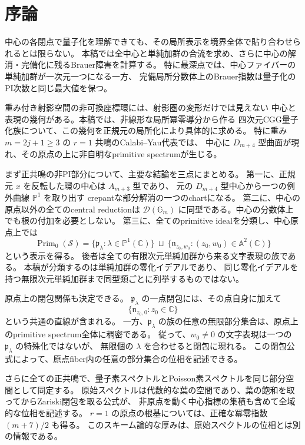 \section{序論}

中心の各閉点で量子化を理解できても、その局所表示を境界全体で貼り合わせられるとは限らない。
本稿では全中心と単純加群の合流を求め、さらに中心の解消・完備化に残るBrauer障害を計算する。
特に最深点では、中心ファイバーの単純加群が一次元一つになる一方、
完備局所分数体上のBrauer指数は量子化のPI次数と同じ最大値を保つ。

重み付き射影空間の非可換座標環には、射影圏の変形だけでは見えない
中心と表現の幾何がある。本稿では、非線形な局所冪零導分から作る
四次元CGG量子化族について、この幾何を正規元の局所化により具体的に求める。
特に重み $m=2j+1\ge3$ の $r=1$ 共鳴のCalabi--Yau代表では、
中心に $D_{m+4}$ 型曲面が現れ、その原点の上に非自明なprimitive spectrumが生じる。

まず正共鳴の非PI部分について、主要な結論を三点にまとめる。
第一に、正規元 $x$ を反転した環の中心は $A_{m+3}$ 型であり、
元の $D_{m+4}$ 型中心から一つの例外曲線 $\mathbb P^1$ を取り出す
crepantな部分解消の一つのchartになる。
第二に、中心の原点以外の全てのcentral reductionは
$\mathcal D(\mathbb G_m)$ に同型である。中心の分数体上でも根の付加を必要としない。
第三に、全てのprimitive idealを分類し、中心原点上では
\[
 \operatorname{Prim}_0(\mathcal S)
 =\{\mathfrak p_\lambda:\lambda\in\mathbb P^1(\mathbb C)\}
 \ \sqcup\
 \{\mathfrak n_{z_0,w_0}:(z_0,w_0)\in\mathbb A^2(\mathbb C)\}
\]
という表示を得る。
後者は全ての有限次元単純加群から来る文字表現の族である。
本稿が分類するのは単純加群の零化イデアルであり、
同じ零化イデアルを持つ無限次元単純加群まで同型類ごとに列挙するものではない。

原点上の閉包関係も決定できる。
$\mathfrak p_\lambda$ の一点閉包には、その点自身に加えて
\[
 \{\mathfrak n_{z_0,0}:z_0\in\mathbb C\}
\]
という共通の直線が含まれる。
一方、$\mathfrak p_\lambda$ の族の任意の無限部分集合は、原点上のprimitive spectrum全体に稠密である。
従って、$w_0\ne0$ の文字表現は一つの $\mathfrak p_\lambda$ の特殊化ではないが、
無限個の $\lambda$ を合わせると閉包に現れる。
この閉包公式によって、原点fiber内の任意の部分集合の位相を記述できる。

さらに全ての正共鳴で、量子素スペクトルとPoisson素スペクトルを同じ部分空間として同定する。
原始スペクトルは代数的な葉の空間であり、葉の飽和を取ってからZariski閉包を取る公式が、
非原点を動く中心指標の集積も含めて全域的な位相を記述する。
$r=1$ の原点の根基については、正確な冪零指数 $(m+7)/2$ も得る。
このスキーム論的な厚みは、原始スペクトルの位相とは別の情報である。

